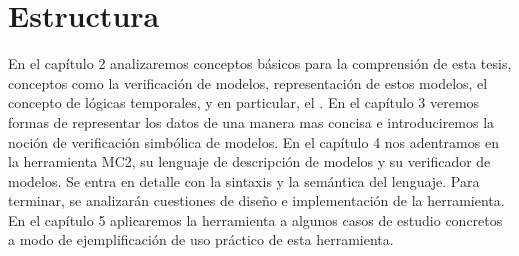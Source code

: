 \section{Estructura}
En el capítulo 2 analizaremos conceptos básicos para la comprensión de esta tesis, conceptos como la verificación de modelos, representación de estos modelos, el concepto de lógicas temporales, y en particular, el {\mucalculo}.
En el capítulo 3 veremos formas de representar los datos de una manera mas concisa e introduciremos la noción de verificación simbólica de modelos.
En el capítulo 4 nos adentramos en la herramienta MC2, su lenguaje de descripción de modelos y su verificador de modelos. Se entra en detalle con la sintaxis y la semántica del lenguaje. Para terminar, se analizarán cuestiones de diseño e implementación de la herramienta. 
En el capítulo 5 aplicaremos la herramienta a algunos casos de estudio concretos a modo de ejemplificación de uso práctico de esta herramienta.



